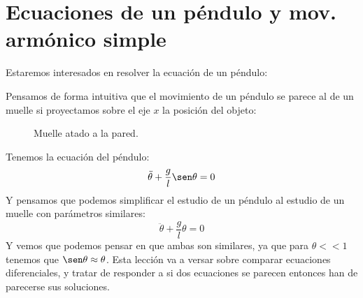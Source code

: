\chapter{Ecuaciones de un péndulo y mov. armónico simple}
\noindent
Estaremos interesados en resolver la ecuación de un péndulo:
\begin{figure}[H]
    \centering
\end{figure}
\noindent
Pensamos de forma intuitiva que el movimiento de un péndulo se parece al de un muelle si proyectamos sobre el eje $x$ la posición del objeto:
\begin{figure}[H]
    \centering
\caption{Muelle atado a la pared.}
\label{fig:muelle}
\end{figure}
\noindent
Tenemos la ecuación del péndulo:
\begin{equation*}
    \ddot{\theta} + \frac{g}{l}\sen\theta = 0
\end{equation*}
Y pensamos que podemos simplificar el estudio de un péndulo al estudio de un muelle con parámetros similares:
\begin{equation*}
    \ddot{\theta} + \frac{g}{l}\theta = 0
\end{equation*}
Y vemos que podemos pensar en que ambas son similares, ya que para $\theta <<1$ tenemos que $\sen\theta\approx \theta$. Esta lección va a versar sobre comparar ecuaciones diferenciales, y tratar de responder a si dos ecuaciones se parecen entonces han de parecerse sus soluciones.

